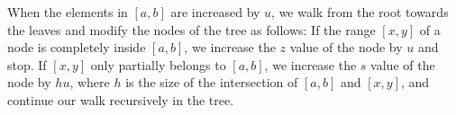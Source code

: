 \begin{center}
\end{center}

When the elements in $[a,b]$ are increased by $u$,
we walk from the root towards the leaves
and modify the nodes of the tree as follows:
If the range $[x,y]$ of a node is
completely inside $[a,b]$,
we increase the $z$ value of the node by $u$ and stop.
If $[x,y]$ only partially belongs to $[a,b]$,
we increase the $s$ value of the node by $hu$,
where $h$ is the size of the intersection of $[a,b]$
and $[x,y]$, and continue our walk recursively in the tree.

